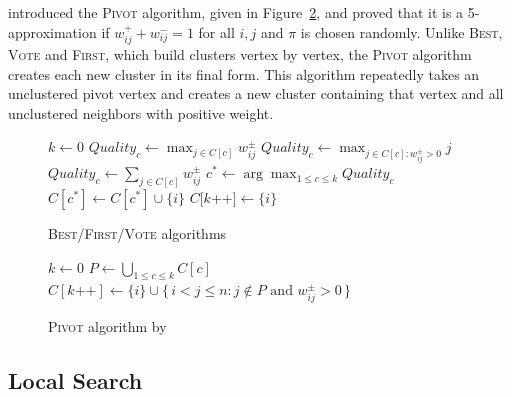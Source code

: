 \documentclass[11pt]{article}
\newcommand{\set}[1]{\{#1\}}			%
\newcommand{\setof}[2]{\{\,{#1}:{#2}\,\}}	%
\newcommand{\alg}[1]{\textsc{#1}}
\begin{document}
 introduced the \textsc{Pivot} algorithm, given in
Figure~\ref{alg:pivot}, and proved that it is a 5-approximation if
$w^+_{ij} + w^-_{ij} = 1$ for all $i,j$ and $\pi$ is chosen
randomly. Unlike \textsc{Best}, \textsc{Vote} and \textsc{First}, which build clusters vertex by
vertex, the \textsc{Pivot} algorithm creates each new cluster in its final
form. This algorithm repeatedly takes an unclustered pivot vertex and
creates a new cluster containing that vertex and all unclustered
neighbors with positive weight.

\begin{figure}[bt]%
\begin{algorithmic}
\STATE $k \gets 0$ 
		\IF{\alg{Best}}
			\STATE $Quality_c \gets \max_{j \in C[c]} w^{\pm}_{ij}$
		\ELSIF{\alg{First}}
			\STATE $Quality_c \gets \max_{j \in C[c] : w^{\pm}_{ij} > 0} j$
		\ELSIF{\alg{Vote}}
			\STATE $Quality_c \gets \sum_{j \in C[c]} w^{\pm}_{ij}$
		\ENDIF
	\ENDFOR
	\STATE $c^* \gets \arg \max_{1 \leq c \leq k} Quality_c$
		\STATE $C[c^*] \gets C[c^*] \cup \{i\}$
	\ELSE
		\STATE $C[k$++$] \gets \{i\}$ 
	\ENDIF
\ENDFOR
\end{algorithmic}
\caption{\textsc{Best}/\textsc{First}/\textsc{Vote} algorithms}
\label{alg:bfv}
\end{figure}

\begin{figure}[bt]%
\begin{algorithmic}
\STATE $k \gets 0$ 
	\STATE $P \gets \bigcup_{1 \leq c \leq k} C[c]$ 
		\STATE $C[k\textrm{++}] \gets \set{i} \cup \setof{i < j \leq
          n}{j \not\in P \textrm{ and } w^{\pm}_{ij} > 0}$
	\ENDIF
\ENDFOR
\end{algorithmic}
\caption{\textsc{Pivot} algorithm by }
\label{alg:pivot}
\end{figure}

\subsection{Local Search}
\end{document}
